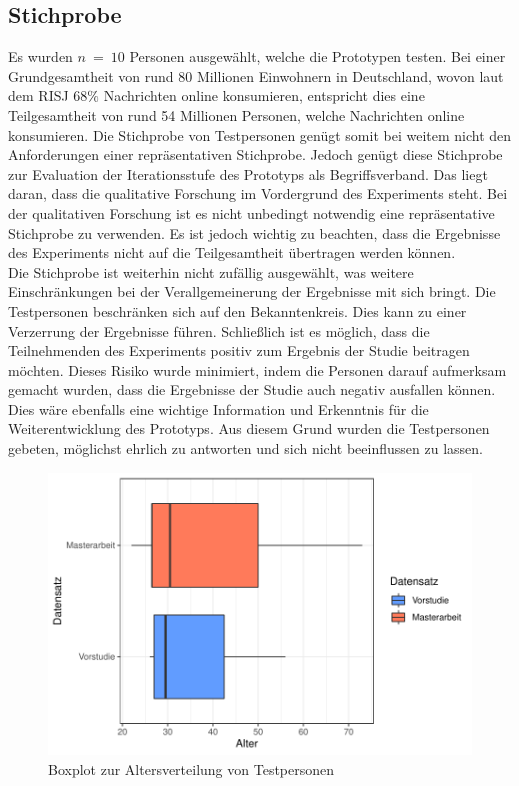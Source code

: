 \subsection{Stichprobe}
Es wurden $n\ =\ 10$ Personen ausgewählt, welche die Prototypen testen.
Bei einer Grundgesamtheit von rund 80 Millionen Einwohnern in Deutschland, wovon laut dem \ac{RISJ} $68\%$ Nachrichten online konsumieren, entspricht dies eine Teilgesamtheit von rund 54 Millionen Personen, welche Nachrichten online konsumieren.
Die Stichprobe von Testpersonen genügt somit bei weitem nicht den Anforderungen einer repräsentativen Stichprobe.
Jedoch genügt diese Stichprobe zur Evaluation der Iterationsstufe des Prototyps als Begriffsverband.
Das liegt daran, dass die qualitative Forschung im Vordergrund des Experiments steht.
Bei der qualitativen Forschung ist es nicht unbedingt notwendig eine repräsentative Stichprobe zu verwenden.
Es ist jedoch wichtig zu beachten, dass die Ergebnisse des Experiments nicht auf die Teilgesamtheit übertragen werden können.\\

Die Stichprobe ist weiterhin nicht zufällig ausgewählt, was weitere Einschränkungen bei der Verallgemeinerung der Ergebnisse mit sich bringt.
Die Testpersonen beschränken sich auf den Bekanntenkreis.
Dies kann zu einer Verzerrung der Ergebnisse führen.
Schließlich ist es möglich, dass die Teilnehmenden des Experiments positiv zum Ergebnis der Studie beitragen möchten.
Dieses Risiko wurde minimiert, indem die Personen darauf aufmerksam gemacht wurden, dass die Ergebnisse der Studie auch negativ ausfallen können.
Dies wäre ebenfalls eine wichtige Information und Erkenntnis für die Weiterentwicklung des Prototyps.
Aus diesem Grund wurden die Testpersonen gebeten, möglichst ehrlich zu antworten und sich nicht beeinflussen zu lassen.\\

\begin{figure}[!ht]
    \centering
    \includegraphics[width=1\columnwidth]{figures/boxplot.pdf}
    \caption{\label{fig:age-boxplot}Boxplot zur Altersverteilung von Testpersonen}
\end{figure}

